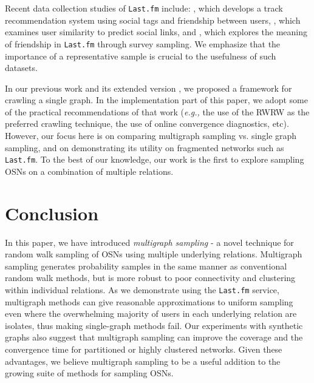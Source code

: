 \documentclass[10pt, conference]{./IEEEtran}
\newcommand{\eg}{{\em e.g., }}
\newcommand{\lastfm}{{\tt Last.fm}\xspace}
\begin{document}
Recent data collection studies of \lastfm include:
%
\cite{konstas2009social}, which develops a track recommendation system using social tags and friendship between users, \cite{schifanella2010folks}, which examines user similarity to predict social links,
%
and  \cite{baym2009tunes}, which explores the meaning of friendship in {\tt Last.fm} through survey sampling.
We emphasize that the importance of a representative sample is crucial to the usefulness of such datasets.

In our previous work \cite{Gjoka2010} and its extended version \cite{Gjoka2011_Facebook_JSAC}, we proposed a framework for crawling a single graph. %
%
In the implementation part of this paper, we adopt some of the practical recommendations of that work (\eg the use of the RWRW as the preferred crawling technique, the use of online convergence diagnostics, etc).
%
%
%
However, our focus here is on comparing multigraph sampling vs. single graph sampling, and on demonstrating its utility on fragmented networks such as \lastfm. 
%
%
To the best of our knowledge, our work is the first to explore sampling OSNs on a combination of multiple relations. 
%















%


\section{Conclusion}
\label{sec:mg_conclude}

In this paper, we have introduced {\em multigraph sampling} - a novel technique for random walk sampling of OSNs using multiple underlying relations. Multigraph sampling generates probability samples in the same manner as conventional random walk methods, but is more robust to poor connectivity and clustering within individual relations.  As we demonstrate using the \lastfm service, multigraph methods can give reasonable approximations to uniform sampling even where the overwhelming majority of users in each underlying relation are isolates, thus making single-graph methods fail.  Our experiments with synthetic graphs also suggest that multigraph sampling can improve  the coverage and the  convergence time for  partitioned or highly clustered networks.
%
Given these advantages, we believe multigraph sampling to be a useful addition to the growing suite of methods for sampling OSNs.
\end{document}
